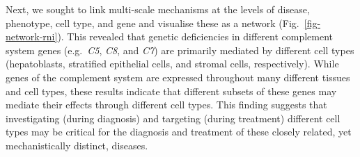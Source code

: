 \documentclass[
]{article}
\begin{document}
Next, we sought to link multi-scale mechanisms at the levels of disease,
phenotype, cell type, and gene and visualise these as a network
(Fig.~\ref{fig-network-rni}). This revealed that genetic deficiencies in
different complement system genes (e.g.~\emph{C5}, \emph{C8}, and
\emph{C7}) are primarily mediated by different cell types (hepatoblasts,
stratified epithelial cells, and stromal cells, respectively). While
genes of the complement system are expressed throughout many different
tissues and cell types, these results indicate that different subsets of
these genes may mediate their effects through different cell types. This
finding suggests that investigating (during diagnosis) and targeting
(during treatment) different cell types may be critical for the
diagnosis and treatment of these closely related, yet mechanistically
distinct, diseases.
\end{document}
